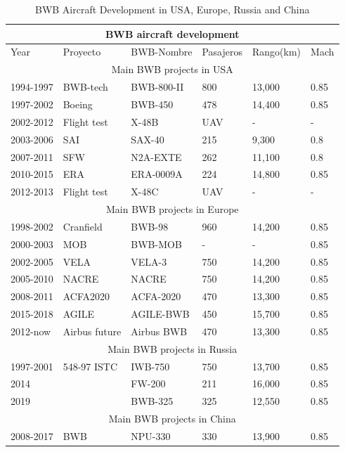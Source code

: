 \begin{table}[!t]
\caption{BWB Aircraft Development in USA, Europe, Russia and China \cite{CHEN2019}}
\label{tab: Desarrollos BWB en el mundo}
\centering
\begin{tabular}{ |p{1.9cm}|p{2.2cm}|p{2.5cm}|p{1.8cm}|p{1.9cm}|p{1.6cm}|  }
\hline
\multicolumn{6}{|c|}{BWB aircraft development} \\
\hline
Year & Proyecto & BWB-Nombre & Pasajeros & Rango(km) & Mach \\
\hline
\multicolumn{6}{|c|}{Main BWB projects in USA} \\
\hline
1994-1997 & BWB-tech & BWB-800-II & 800 & 13,000 & 0.85 \\
1997-2002 & Boeing & BWB-450 & 478 & 14,400 & 0.85 \\
2002-2012 & Flight test & X-48B & UAV & - & - \\
2003-2006 & SAI & SAX-40 & 215 & 9,300 & 0.8 \\
2007-2011 & SFW & N2A-EXTE & 262 & 11,100 & 0.8 \\
2010-2015 & ERA & ERA-0009A & 224 & 14,800 & 0.85   \\
2012-2013 & Flight test & X-48C & UAV & - & - \\
\hline
\multicolumn{6}{|c|}{Main BWB projects in Europe} \\
\hline
1998-2002 & Cranfield & BWB-98 & 960 & 14,200 & 0.85 \\
2000-2003 & MOB & BWB-MOB & - & - & 0.85 \\
2002-2005 & VELA & VELA-3 & 750 & 14,200 & 0.85 \\
2005-2010 & NACRE & NACRE & 750 & 14,200 & 0.85 \\
2008-2011 & ACFA2020 & ACFA-2020 & 470 & 13,300 & 0.85 \\
2015-2018 & AGILE & AGILE-BWB & 450 & 15,700 & 0.85 \\
2012-now & Airbus future & Airbus BWB & 470 & 13,300 & 0.85 \\
\hline
\multicolumn{6}{|c|}{Main BWB projects in Russia} \\
\hline
1997-2001 & 548-97 ISTC & IWB-750 & 750 & 13,700 & 0.85 \\
2014 &   & FW-200 & 211 & 16,000 & 0.85 \\
2019 &  & BWB-325 & 325 & 12,550 & 0.85 \\
\hline
\multicolumn{6}{|c|}{Main BWB projects in China} \\
\hline
2008-2017 & BWB & NPU-330 & 330 & 13,900 & 0.85 \\
\hline
\end{tabular}
\end{table}


